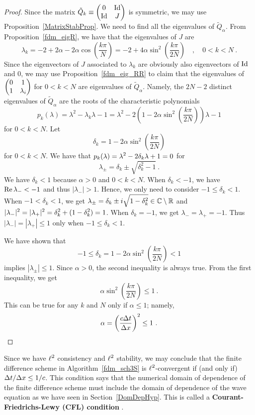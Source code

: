 \begin{proof}
Since the matrix $\displaystyle \tilde{Q}_k \equiv
\begin{pmatrix} 0 & \operatorname{Id} \\ \operatorname{Id} & J \end{pmatrix}$ is symmetric, we may
use Proposition~\ref{MatrixStabProp}.
We need to find all the eigenvalues of $\tilde{Q}_\alpha$.
From Proposition~\ref{fdm_eigR}, we have that the eigenvalues of $J$ are
\[
\lambda_k = -2 +2\alpha -2\alpha \cos\left(\frac{k\pi}{N}\right)
= -2 + 4 \alpha \sin^2\left(\frac{k\pi}{2N}\right)
\quad , \quad 0 < k < N \ .
\]
Since the eigenvectors of $J$ associated to $\lambda_k$ are obviously
also eigenvectors of $\operatorname{Id}$ and $0$, we may use
Proposition~\ref{fdm_eig_RR} to claim that the eigenvalues of
$\displaystyle \begin{pmatrix} 0 & 1 \\ 1 & \lambda_i\end{pmatrix}$
for $0 < k < N$ are eigenvalues of $\tilde{Q}_\alpha$.  Namely, the
$2N-2$ distinct eigenvalues of $\tilde{Q}_\alpha$ are the roots of the
characteristic polynomials
\[
p_k(\lambda) =  \lambda^2 -\lambda_k \lambda - 1
= \lambda^2 -2\left(1 - 2 \alpha \sin^2\left(\frac{k\pi}{2N}\right)
\right) \lambda - 1
\]
for $0 < k < N$.  Let
\[
  \delta_k = 1 - 2\alpha \sin^2\left( \frac{k \pi}{2N} \right)
\]
for $0 < k < N$.  
We have that
$\displaystyle p_k(\lambda) = \lambda^2 -2 \delta_k \lambda + 1 = 0$
for
\[
\lambda_{\pm} = \delta_k \pm \sqrt{\delta_k^2 - 1} \ .
\]
We have $\delta_k < 1$ because $\alpha>0$ and $0<k<N$.
When $\delta_k<-1$, we have
$\operatorname{Re} \lambda_{-} < -1$ and thus $|\lambda_{-}|>1$.  Hence, we only need to
consider $-1 \leq \delta_k < 1$.  When $-1 < \delta_k < 1$, we get
$\displaystyle
\lambda_\pm = \delta_k \pm i\sqrt{1 - \delta_k^2} \in \mathbb{C} \setminus \mathbb{R}$
and
$\displaystyle |\lambda_{-}|^2 = |\lambda_{+}|^2
= \delta_k^2 + ( 1 - \delta_k^2) = 1$.
When $\delta_k = -1$, we get $\lambda_{-} = \lambda_{+} = - 1$.  Thus
$|\lambda_{-}| = |\lambda_{+}| \leq 1$ only when $-1 \leq \delta_k < 1$.

We have shown that
\[
-1 \leq \delta_k = 1 -2 \alpha \sin^2\left( \frac{k \pi}{2N}\right) < 1
\]
implies $|\lambda_{\pm}|\leq 1$.  Since $\alpha >0$, the second
inequality is always true. From the first inequality, we get
\[
\alpha \sin^2\left( \frac{k \pi}{2N} \right) \leq 1 \ .
\]
This can be true for any $k$ and $N$ only if $\alpha \leq 1$;
namely,
\[
\alpha = \left( \frac{c \Delta{t}}{\Delta{x}}\right)^2 \leq 1 \ .
\]
\end{proof}

Since we have $\displaystyle \ell^2$ consistency and
$\displaystyle \ell^2$ stability, we may 
conclude that the finite difference scheme in
Algorithm~\ref{fdm_sch3S} is $\displaystyle \ell^2$-convergent if (and only if) 
$\Delta{t} / \Delta{x} \leq 1/c$.
This condition says that the numerical domain of dependence of the
finite difference scheme must include the domain of dependence of the
wave equation as we have seen in Section~\ref{DomDepHyp}.
This is called a {\bfseries Courant-Friedrichs-Lewy (CFL)
condition}
.

